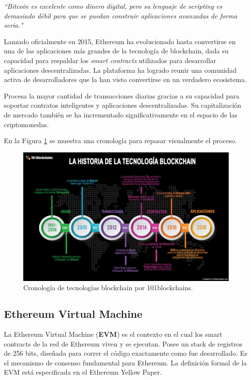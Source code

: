 \begin{displayquote}
\textit{``Bitcoin es excelente como dinero digital, pero su lenguaje de scripting es demasiado débil para que se puedan construir aplicaciones avanzadas de forma seria."}
\end{displayquote}

Lanzado oficialmente en 2015, Ethereum ha evolucionado hasta convertirse en una de las aplicaciones más grandes de la tecnología de blockchain, dada su capacidad para respaldar los \textit{smart contracts} utilizados para desarrollar aplicaciones descentralizadas. La plataforma ha logrado reunir una comunidad activa de desarrolladores que la han visto convertirse en un verdadero ecosistema.

Procesa la mayor cantidad de transacciones diarias gracias a su capacidad para soportar contratos inteligentes y aplicaciones descentralizadas. Su capitalización de mercado también se ha incrementado significativamente en el espacio de las criptomonedas.

En la Figura \ref{fig:blockchain history} se muestra una cronología para repasar visualmente el proceso.

\begin{figure}[h]
    \centering
    \includegraphics[scale=0.3]{images/historiablockchain.jpg}
    \caption{ Cronología de tecnologías blockchain por 101blockchains.}
    \label{fig:blockchain history}
\end{figure}

\subsection{Ethereum Virtual Machine}
La Ethereum Virtual Machine (\textbf{EVM}) es el contexto en el cual los smart contracts de la red de Ethereum viven y se ejecutan. Posee un stack de registros de 256 bits, diseñada para correr el código exactamente como fue desarrollado. Es el mecanismo de consenso fundamental para Ethereum. La definición formal de la EVM está especificada en el Ethereum Yellow Paper.


